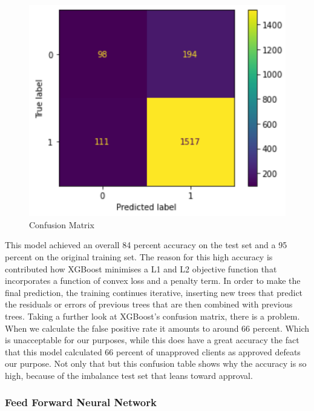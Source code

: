 \documentclass[12pt]{article}
\begin{document}
\begin{figure}
    \centering
    \includegraphics[scale = .30]{figures/XGBconf.png} 
    \caption{Confusion Matrix}
\end{figure}

\noindent This model achieved an overall 84 percent accuracy on the test set and a 95 percent on the original training set. The reason for this high accuracy is contributed how XGBoost minimises a L1 and L2 objective function that incorporates a function of convex loss and a  penalty term. In order to make the final prediction, the training continues iterative, inserting new trees that predict the residuals or errors of previous trees that are then combined with previous trees. Taking a further look at XGBoost's confusion matrix, there is a problem. When we calculate the false positive rate it amounts to around 66 percent. Which is unacceptable for our purposes, while this does have a great accuracy the fact that this model calculated 66 percent of unapproved clients as approved defeats our purpose. Not only that but this confusion table shows why the accuracy is so high, because of the imbalance test set that leans toward approval.

\subsubsection{Feed Forward Neural Network}
\end{document}
